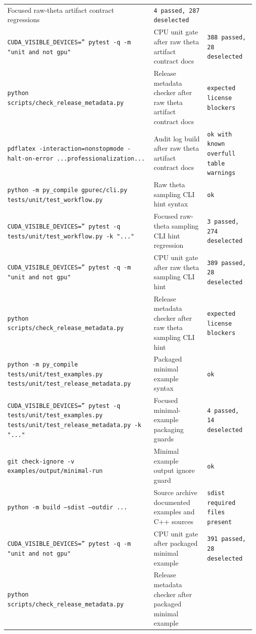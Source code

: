 \documentclass[11pt]{article}
\begin{document}
\begin{center}
\begin{tabular}{lll}
Focused raw-theta artifact contract regressions &
\texttt{4 passed, 287 deselected} \\
\texttt{CUDA\_VISIBLE\_DEVICES='' pytest -q -m "unit and not gpu"} &
CPU unit gate after raw theta artifact contract docs &
\texttt{388 passed, 28 deselected} \\
\texttt{python scripts/check\_release\_metadata.py} &
Release metadata checker after raw theta artifact contract docs &
\texttt{expected license blockers} \\
\texttt{pdflatex -interaction=nonstopmode -halt-on-error ...professionalization...} &
Audit log build after raw theta artifact contract docs &
\texttt{ok with known overfull table warnings} \\
\texttt{python -m py\_compile gpurec/cli.py tests/unit/test\_workflow.py} &
Raw theta sampling CLI hint syntax &
\texttt{ok} \\
\texttt{CUDA\_VISIBLE\_DEVICES='' pytest -q tests/unit/test\_workflow.py -k "..."} &
Focused raw-theta sampling CLI hint regression &
\texttt{3 passed, 274 deselected} \\
\texttt{CUDA\_VISIBLE\_DEVICES='' pytest -q -m "unit and not gpu"} &
CPU unit gate after raw theta sampling CLI hint &
\texttt{389 passed, 28 deselected} \\
\texttt{python scripts/check\_release\_metadata.py} &
Release metadata checker after raw theta sampling CLI hint &
\texttt{expected license blockers} \\
\texttt{python -m py\_compile tests/unit/test\_examples.py tests/unit/test\_release\_metadata.py} &
Packaged minimal example syntax &
\texttt{ok} \\
\texttt{CUDA\_VISIBLE\_DEVICES='' pytest -q tests/unit/test\_examples.py tests/unit/test\_release\_metadata.py -k "..."} &
Focused minimal-example packaging guards &
\texttt{4 passed, 14 deselected} \\
\texttt{git check-ignore -v examples/output/minimal-run} &
Minimal example output ignore guard &
\texttt{ok} \\
\texttt{python -m build --sdist --outdir ...} &
Source archive documented examples and C++ sources &
\texttt{sdist required files present} \\
\texttt{CUDA\_VISIBLE\_DEVICES='' pytest -q -m "unit and not gpu"} &
CPU unit gate after packaged minimal example &
\texttt{391 passed, 28 deselected} \\
\texttt{python scripts/check\_release\_metadata.py} &
Release metadata checker after packaged minimal example &

\end{tabular}
\end{center}
\end{document}
